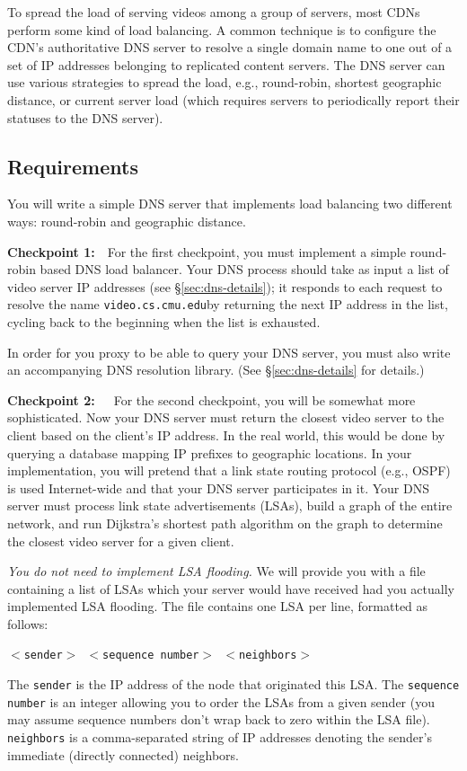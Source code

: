 \documentclass{article}
\newcommand{\theurl}{\texttt{video.cs.cmu.edu}}
\begin{document}
To spread the load of serving videos among a group of servers, most CDNs
perform some kind of load balancing. A common technique is to configure the
CDN's authoritative DNS server to resolve a single domain name to one out of a
set of IP addresses belonging to replicated content servers. The DNS server can
use various strategies to spread the load, e.g., round-robin, shortest
geographic distance, or current server load (which requires servers to
periodically report their statuses to the DNS server).

\subsection{Requirements}

You will write a simple DNS server that implements load balancing two different
ways: round-robin and geographic distance.

\bigskip \noindent \textbf{Checkpoint 1:}~~For the first checkpoint, you must
implement a simple round-robin based DNS load balancer. Your DNS process should
take as input a list of video server IP addresses (see \S\ref{sec:dns-details});
it responds to each request to resolve the name \theurl by returning the next
IP address in the list, cycling back to the beginning when the list is
exhausted.

In order for you proxy to be able to query your DNS server, you must also write
an accompanying DNS resolution library. (See \S\ref{sec:dns-details} for
details.)



\bigskip \noindent \textbf{Checkpoint 2:}~~~For the second checkpoint, you will
be somewhat more sophisticated. Now your DNS server must return the closest
video server to the client based on the client's IP address. In the real world,
this would be done by querying a database mapping IP prefixes to geographic
locations. In your implementation, you will pretend that a link state routing
protocol (e.g., OSPF) is used Internet-wide and that your DNS server
participates in it. Your DNS server must process link state advertisements
(LSAs), build a graph of the entire network, and run Dijkstra's shortest path
algorithm on the graph to determine the closest video server for a given
client.

\emph{You do not need to implement LSA flooding.} We will provide you with a
file containing a list of LSAs which your server would have received had you
actually implemented LSA flooding.  The file contains one LSA per line,
formatted as follows:
\begin{center}
	\texttt{$<$sender$>$ $<$sequence number$>$ $<$neighbors$>$}
\end{center}
The \texttt{sender} is the IP address of the node that originated this LSA. The
\texttt{sequence number} is an integer allowing you to order the LSAs from a
given sender (you may assume sequence numbers don't wrap back to zero within
the LSA file). \texttt{neighbors} is a comma-separated string of IP addresses
denoting the sender's immediate (directly connected) neighbors.
\end{document}
